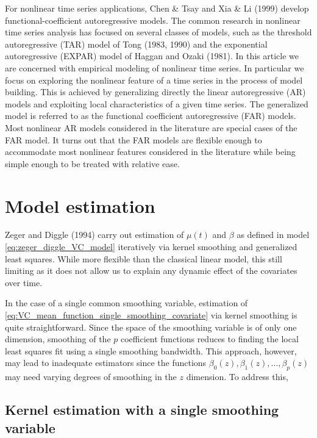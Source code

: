 \documentclass[12pt]{article}
\newcommand*\needsparaphrased{\color{red}}
\begin{document}
For nonlinear time series applications, Chen \& Tsay \cite{chen1993functional} and Xia \& Li (1999) develop functional-coefficient autoregressive models. The common research in nonlinear time series analysis has focused on several classes of models, such as the threshold autoregressive (TAR) model of Tong (1983, 1990) and the exponential autoregressive (EXPAR) model of Haggan and Ozaki (1981). {\needsparaphrased In this article we are concerned with empirical modeling of nonlinear time series. In particular we focus on exploring the nonlinear feature of a time series in the process of model building. This is achieved by generalizing directly the linear autoregressive (AR) models and exploiting local characteristics of a given time series. The generalized model is referred to as the functional coefficient autoregressive (FAR) models. Most nonlinear AR models considered in the literature are special cases of the FAR model. It turns out that the FAR models are flexible enough to accommodate most nonlinear features considered in the literature while being simple enough to be treated with relative ease. }


\section{Model estimation}

Zeger and Diggle (1994) carry out estimation of $\mu\left(t\right)$ and $\beta$ as defined in model \ref{eq:zeger_diggle_VC_model} iteratively via kernel smoothing and generalized least squares. While more flexible than the classical linear model, this still limiting as it does not allow us to explain any dynamic effect of the covariates over time.  


In the case of a single common smoothing variable, estimation of \ref{eq:VC_mean_function_single_smoothing_covariate} via kernel smoothing is quite straightforward. Since the space of the smoothing variable is of only one dimension, smoothing of the $p$ coefficient functions reduces to finding the local least squares fit using a single smoothing bandwidth. This approach, however, may lead to inadequate estimators since the functions $\beta_0\left(z\right), \beta_1\left(z\right), \dots, \beta_p\left(z\right)$ may need varying degrees of smoothing in the $z$ dimension. To address this, 

\subsection{Kernel estimation with a single smoothing variable}
\end{document}
